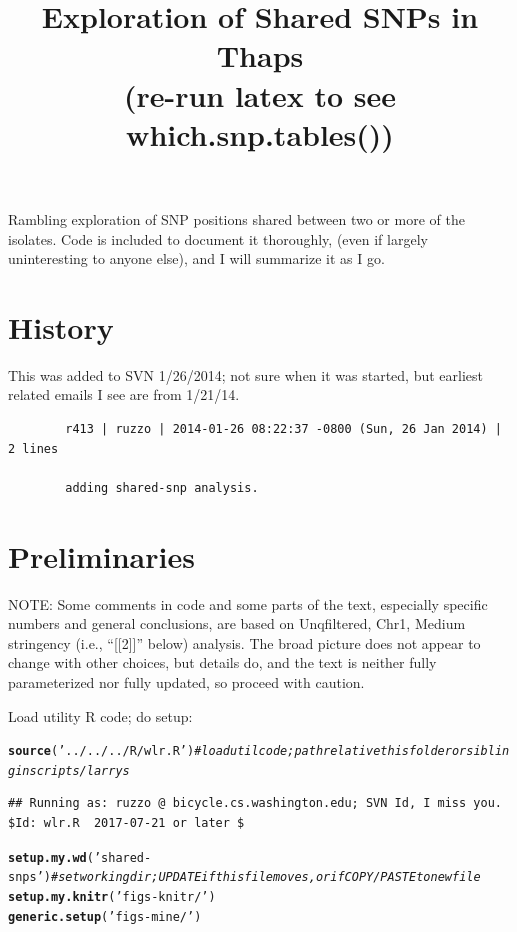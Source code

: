 \documentclass{article}\usepackage[]{graphicx}\usepackage[]{color}
\makeatletter
\newcommand{\hlstr}[1]{\textcolor[rgb]{0.192,0.494,0.8}{#1}}%
\newcommand{\hlcom}[1]{\textcolor[rgb]{0.678,0.584,0.686}{\textit{#1}}}%
\newcommand{\hlstd}[1]{\textcolor[rgb]{0.345,0.345,0.345}{#1}}%
\newcommand{\hlkwd}[1]{\textcolor[rgb]{0.737,0.353,0.396}{\textbf{#1}}}%
\newenvironment{kframe}{%
 \def\at@end@of@kframe{}%
 \ifinner\ifhmode%
  \def\at@end@of@kframe{\end{minipage}}%
  \begin{minipage}{\columnwidth}%
 \fi\fi%
 \def\FrameCommand##1{\hskip\@totalleftmargin \hskip-\fboxsep
 \colorbox{shadecolor}{##1}\hskip-\fboxsep
     \hskip-\linewidth \hskip-\@totalleftmargin \hskip\columnwidth}%
 \MakeFramed {\advance\hsize-\width
   \@totalleftmargin\z@ \linewidth\hsize
   \@setminipage}}%
 {\par\unskip\endMakeFramed%
 \at@end@of@kframe}
\newenvironment{knitrout}{}{} %
\providecommand{\whichsnptables}{(re-run latex to see which.snp.tables())}
\makeatother
\begin{document}
\pagestyle{headings}
\title{Exploration of Shared SNPs in Thaps\\\large\whichsnptables}
\maketitle

Rambling exploration of SNP positions shared between two or more of the isolates.  Code is included to 
document it thoroughly, (even if largely uninteresting to anyone else), and I will summarize it as I go.

\tableofcontents

\section{History}
This was added to SVN 1/26/2014; not sure when it was started, but earliest related emails I see are from 1/21/14.
{\scriptsize
\begin{verbatim}
        r413 | ruzzo | 2014-01-26 08:22:37 -0800 (Sun, 26 Jan 2014) | 2 lines

        adding shared-snp analysis.
\end{verbatim}
}

\section{Preliminaries}

NOTE: Some comments in code and some parts of the text, especially specific numbers and general 
conclusions, are based on Unqfiltered, Chr1, Medium stringency (i.e., ``[[2]]'' below) analysis.  
The broad picture does not appear to change with other choices, but details do, and the text is  
neither fully parameterized nor fully updated, so proceed with caution.  

Load utility R code; do setup:

\begin{knitrout}\footnotesize
{}\color{fgcolor}\begin{kframe}
\begin{alltt}
\hlkwd{source}\hlstd{(}\hlstr{'../../../R/wlr.R'}\hlstd{)} \hlcom{# load util code; path relative this folder or sibling in scripts/larrys }
\end{alltt}
\begin{verbatim}
## Running as: ruzzo @ bicycle.cs.washington.edu; SVN Id, I miss you.  $Id: wlr.R  2017-07-21 or later $
\end{verbatim}
\begin{alltt}
\hlkwd{setup.my.wd}\hlstd{(}\hlstr{'shared-snps'}\hlstd{)} \hlcom{# set working dir; UPDATE if this file moves, or if COPY/PASTE to new file}
\hlkwd{setup.my.knitr}\hlstd{(}\hlstr{'figs-knitr/'}\hlstd{)}
\hlkwd{generic.setup}\hlstd{(}\hlstr{'figs-mine/'}\hlstd{)}
\end{alltt}
\end{kframe}
\end{knitrout}
\end{document}
